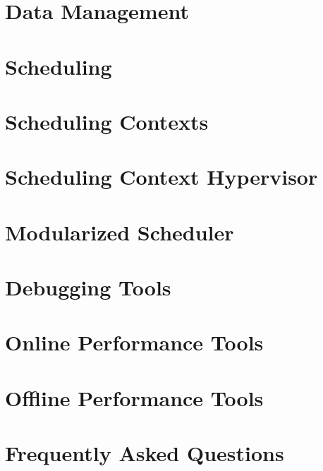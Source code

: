 \chapter{Data Management}
\label{DataManagement}
\hypertarget{DataManagement}{}


\chapter{Scheduling}
\label{Scheduling}
\hypertarget{Scheduling}{}


\chapter{Scheduling Contexts}
\label{SchedulingContexts}
\hypertarget{SchedulingContexts}{}


\chapter{Scheduling Context Hypervisor}
\label{SchedulingContextHypervisor}
\hypertarget{SchedulingContextHypervisor}{}


\chapter{Modularized Scheduler}
\label{ModularizedScheduler}
\hypertarget{ModularizedScheduler}{}


\chapter{Debugging Tools}
\label{DebuggingTools}
\hypertarget{DebuggingTools}{}


\chapter{Online Performance Tools}
\label{OnlinePerformanceTools}
\hypertarget{OnlinePerformanceTools}{}


\chapter{Offline Performance Tools}
\label{OfflinePerformanceTools}
\hypertarget{OfflinePerformanceTools}{}


\chapter{Frequently Asked Questions}
\label{FrequentlyAskedQuestions}
\hypertarget{FrequentlyAskedQuestions}{}


